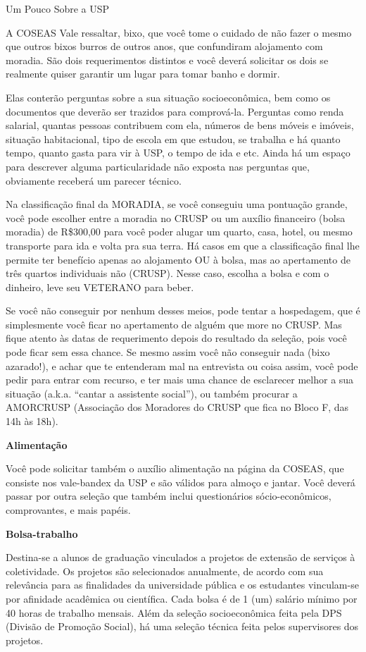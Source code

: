 \begin{secao}{Um Pouco Sobre a USP}
\begin{subsecao}{A COSEAS}
Vale ressaltar, bixo, que você tome o cuidado de não fazer o mesmo que outros bixos burros de outros anos, que confundiram alojamento com moradia. São dois requerimentos distintos e você deverá solicitar os dois se realmente quiser garantir um lugar para tomar banho e dormir.

Elas conterão perguntas sobre a sua situação socioeconômica, bem como os documentos que deverão ser trazidos para comprová-la. Perguntas como renda salarial, quantas pessoas contribuem com ela, números de bens móveis e imóveis, situação habitacional, tipo de escola em que estudou, se trabalha e há quanto tempo, quanto gasta para vir à USP, o tempo de ida e etc. Ainda há um espaço para descrever alguma particularidade não exposta nas perguntas que, obviamente receberá um parecer técnico.

Na classificação final da MORADIA, se você conseguiu uma pontuação grande, você pode escolher entre a moradia no CRUSP ou um auxílio financeiro (bolsa moradia) de R\$300,00 para você poder alugar um quarto, casa, hotel, ou mesmo transporte para ida e volta pra sua terra.  Há casos em que a classificação final lhe permite ter benefício apenas ao alojamento OU à bolsa, mas ao apertamento de três quartos individuais não (CRUSP). Nesse caso, escolha a bolsa e com o dinheiro, leve seu VETERANO para beber.

Se você não conseguir por nenhum desses meios, pode tentar a hospedagem, que é simplesmente você ficar no apertamento de alguém que more no CRUSP. Mas fique atento às datas de requerimento depois do resultado da seleção, pois você pode ficar sem essa chance. Se mesmo assim você não conseguir nada (bixo azarado!), e achar que te entenderam mal na entrevista ou coisa assim, você pode pedir para entrar com recurso, e ter mais uma chance de esclarecer melhor a sua situação (a.k.a. “cantar a assistente social”), ou também procurar a AMORCRUSP (Associação dos Moradores do CRUSP que fica no Bloco F, das 14h às 18h).

{\bf Alimentação}

Você pode solicitar também o auxílio alimentação na página da COSEAS, que consiste nos vale-bandex da USP e são válidos para almoço e jantar. Você deverá passar por outra seleção que também inclui questionários sócio-econômicos, comprovantes, e mais papéis.

{\bf Bolsa-trabalho}


Destina-se a alunos de graduação vinculados a projetos de extensão de serviços à coletividade. Os projetos são selecionados anualmente, de acordo com sua relevância para as finalidades da universidade pública e os estudantes vinculam-se por afinidade acadêmica ou científica. Cada bolsa é de 1 (um) salário mínimo por 40 horas de trabalho mensais. Além da seleção socioeconômica feita pela DPS (Divisão de Promoção Social), há uma seleção técnica feita pelos supervisores dos projetos.


\end{subsecao}
\end{secao}
